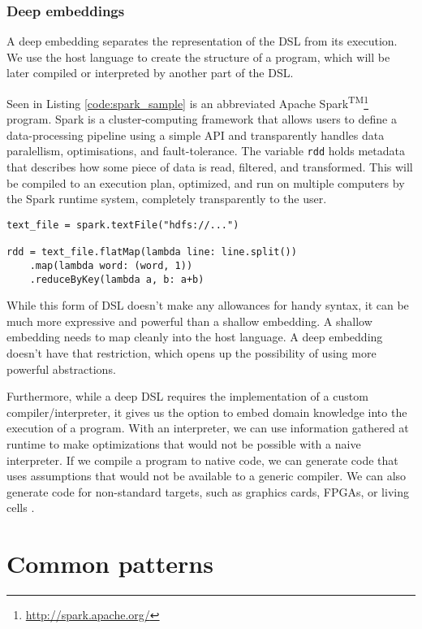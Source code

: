 \subsubsection{Deep embeddings}

A deep embedding separates the representation of the DSL from its execution.
We use the host language to create the structure of a program, which will be later compiled or interpreted by another part of the DSL.

Seen in Listing \ref{code:spark_sample} is an abbreviated Apache Spark\textsuperscript{TM}\footnote{\url{http://spark.apache.org/}} program.
Spark is a cluster-computing framework that allows users to define a data-processing pipeline using a simple API and transparently handles data paralellism, optimisations, and fault-tolerance.
The variable \texttt{rdd} holds metadata that describes how some piece of data is read, filtered, and transformed.
This will be compiled to an execution plan, optimized, and run on multiple computers by the Spark runtime system, completely transparently to the user.

\begin{lstlisting}[caption=Sample Spark code in Python, label=code:spark_sample]
text_file = spark.textFile("hdfs://...")
 
rdd = text_file.flatMap(lambda line: line.split())
    .map(lambda word: (word, 1))
    .reduceByKey(lambda a, b: a+b)
\end{lstlisting}

While this form of DSL doesn't make any allowances for handy syntax, it can be much more expressive and powerful than a shallow embedding.
A shallow embedding needs to map cleanly into the host language.
A deep embedding doesn't have that restriction, which opens up the possibility of using more powerful abstractions.

Furthermore, while a deep DSL requires the implementation of a custom compiler/interpreter, it gives us the option to embed domain knowledge into the execution of a program.
With an interpreter, we can use information gathered at runtime to make optimizations that would not be possible with a naive interpreter.
If we compile a program to native code, we can generate code that uses assumptions that would not be available to a generic compiler.
We can also generate code for non-standard targets, such as graphics cards, FPGAs, or living cells \autocite{Pedersen:2009}.

\section{Common patterns}

